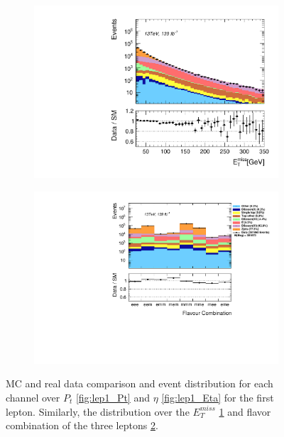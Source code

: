 \begin{figure}
{\begin{subfigure}{.405\textwidth}
        \includegraphics[width=\textwidth]{Figures/FeaturesHistograms/met_Et.pdf}
        \vspace{-0.75cm}
        \caption{}
        \label{fig:met_Et}
    \end{subfigure}
    \hfill
    \begin{subfigure}{.525\textwidth}
        \includegraphics[width=\textwidth]{Figures/FeaturesHistograms/flcomp.pdf}
        \vspace{-0.75cm}
        \caption{}
        \label{fig:flcomp}
    \end{subfigure}
    }
    \caption[\acs{MC} simulated and measured data comparison and event distribution for each channel for the $P_t$ and $\eta$ of the leading lepton 
    as well as the $E_T^{miss}$ and flavor combination from each event.]{\ac{MC} and real data comparison and event distribution for each channel over $P_t$ \ref{fig:lep1_Pt} and 
    $\eta$ \ref{fig:lep1_Eta} for the first lepton. Similarly, the distribution over the $E_T^{miss}$ \ref{fig:met_Et}
    and flavor combination of the three leptons \ref{fig:flcomp}.}
    \label{fig:Dist1}
\end{figure}